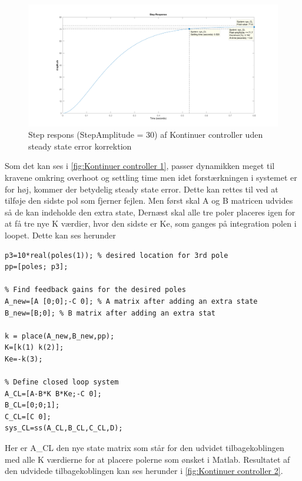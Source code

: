 \begin{figure}[H]
	\centering
	\includegraphics[width = 1\textwidth]{figur/Step_continues_1}
	\caption{Step respons (StepAmplitude = 30) af Kontinuer controller uden steady state error korrektion}
	\label{fig:Kontinuer controller 1}
\end{figure}

Som det kan ses i \autoref{fig:Kontinuer controller 1}, passer dynamikken meget til kravene omkring overhoot og settling time men idet forstærkningen i systemet er for høj, kommer der  betydelig steady state error. Dette kan rettes til ved at tilføje den sidste pol som fjerner fejlen. Men først skal A og B matricen udvides så de kan indeholde den extra state, Dernæst skal alle tre poler placeres igen for at få tre nye K værdier, hvor den sidste er Ke, som ganges på integration polen i loopet. Dette kan ses herunder

\begin{lstlisting}[frame=single]
p3=10*real(poles(1)); % desired location for 3rd pole
pp=[poles; p3];

% Find feedback gains for the desired poles
A_new=[A [0;0];-C 0]; % A matrix after adding an extra state
B_new=[B;0]; % B matrix after adding an extra stat

k = place(A_new,B_new,pp);
K=[k(1) k(2)];
Ke=-k(3);

% Define closed loop system
A_CL=[A-B*K B*Ke;-C 0];
B_CL=[0;0;1];
C_CL=[C 0];
sys_CL=ss(A_CL,B_CL,C_CL,D);
\end{lstlisting}

Her er A\_CL den nye state matrix som står for den udvidet tilbagekoblingen med alle K værdierne for at placere polerne som ønsket i Matlab. Resultatet af den udvidede tilbagekoblingen kan ses herunder i \autoref{fig:Kontinuer controller 2}. 

